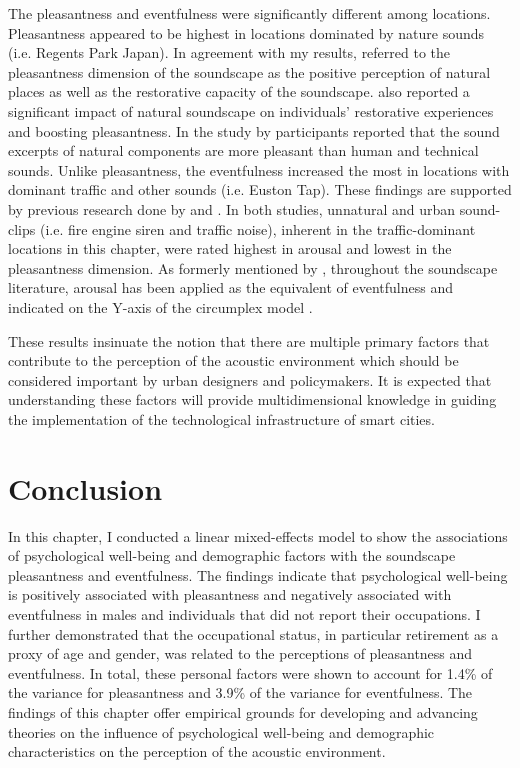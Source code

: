 The pleasantness and eventfulness were significantly different among locations. Pleasantness appeared to be highest in locations dominated by nature sounds (i.e. Regents Park Japan). In agreement with my results, \citet{Payne2013production} referred to the pleasantness dimension of the soundscape as the positive perception of natural places as well as the restorative capacity of the soundscape. \citet{Zhang2014Research} also reported a significant impact of natural soundscape on individuals' restorative experiences and boosting pleasantness. In the study by \citet{Axelsson2010principal} participants reported that the sound excerpts of natural components are more pleasant than human and technical sounds. Unlike pleasantness, the eventfulness increased the most in locations with dominant traffic and other sounds (i.e. Euston Tap). These findings are supported by previous research done by \citet{Bradley2000Emotion} and \citet{Hume2013Physiological}. In both studies, unnatural and urban sound-clips (i.e. fire engine siren and traffic noise), inherent in the traffic-dominant locations in this chapter, were rated highest in arousal and lowest in the pleasantness dimension. As formerly mentioned by \citet{Erfanian2019Psychophysiological}, throughout the soundscape literature, arousal has been applied as the equivalent of eventfulness and indicated on the Y-axis of the circumplex model \citep{Axelsson2010principal,Erfanian2019Psychophysiological}.

These results insinuate the notion that there are multiple primary factors \citep{Bradley2000Emotion} that contribute to the perception of the acoustic environment which should be considered important by urban designers and policymakers. It is expected that understanding these factors will provide multidimensional knowledge in guiding the implementation of the technological infrastructure of smart cities.


\section{Conclusion}

In this chapter, I conducted a linear mixed-effects model to show the associations of psychological well-being and demographic factors with the soundscape pleasantness and eventfulness. The findings indicate that psychological well-being is positively associated with pleasantness and negatively associated with eventfulness in males and individuals that did not report their occupations. I further demonstrated that the occupational status, in particular retirement as a proxy of age and gender, was related to the perceptions of pleasantness and eventfulness. In total, these personal factors were shown to account for 1.4\% of the variance for pleasantness and 3.9\% of the variance for eventfulness. The findings of this chapter offer empirical grounds for developing and advancing theories on the influence of psychological well-being and demographic characteristics on the perception of the acoustic environment. 